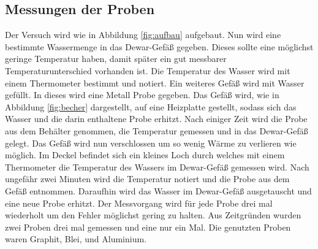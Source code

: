 \subsection{Messungen der Proben}
Der Versuch wird wie in Abbildung \ref{fig:aufbau} aufgebaut.
Nun wird eine bestimmte Wassermenge in das Dewar-Gefäß gegeben.
Dieses sollte eine möglichst geringe Temperatur haben, damit später ein gut messbarer Temperaturunterschied vorhanden ist.
Die Temperatur des Wasser wird mit einem Thermometer bestimmt und notiert.
Ein weiteres Gefäß wird mit Wasser gefüllt. 
In dieses wird eine Metall Probe gegeben.
Das Gefäß wird, wie in Abbildung \ref{fig:becher} dargestellt, auf eine Heizplatte gestellt, sodass sich das Wasser und die darin enthaltene Probe erhitzt.
Nach einiger Zeit wird die Probe aus dem Behälter genommen, die Temperatur gemessen und in das Dewar-Gefäß gelegt.
Das Gefäß wird nun verschlossen um so wenig Wärme zu verlieren wie möglich.
Im Deckel befindet sich ein kleines Loch durch welches mit einem Thermometer die Temperatur des Wassers im Dewar-Gefäß gemessen wird.
Nach ungefähr zwei Minuten wird die Temperatur notiert und die Probe aus dem Gefäß entnommen.
Daraufhin wird das Wasser im Dewar-Gefäß ausgetauscht und eine neue Probe erhitzt.
Der Messvorgang wird für jede Probe drei mal wiederholt um den Fehler möglichst gering zu halten.
Aus Zeitgründen wurden zwei Proben drei mal gemessen und eine nur ein Mal.
Die genutzten Proben waren Graphit, Blei, und Aluminium. 
